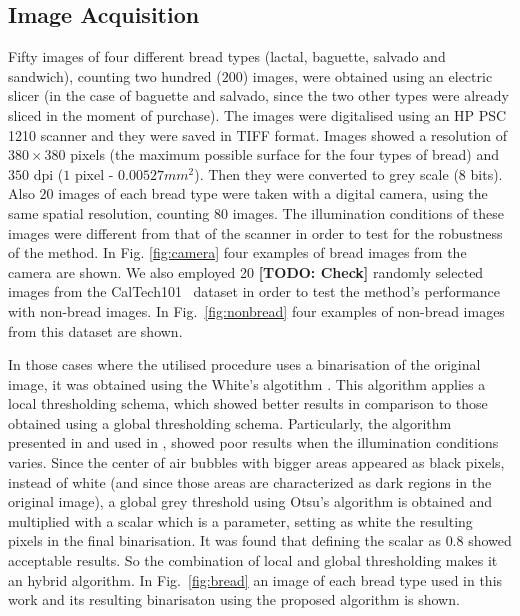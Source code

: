 \documentclass[oneside,a4paper,english,links]{amca}
\newcommand{\todo}[1]{\textbf{[TODO: #1]}}
\begin{document}
\subsection{Image Acquisition}
Fifty images of four different bread types (lactal, baguette, salvado and sandwich), counting two hundred ($200$) images, were obtained using an electric slicer (in the case of baguette and salvado, since the two other types were already sliced in the moment of purchase). The images were digitalised using an HP PSC 1210 scanner and they were saved in TIFF format. Images showed a resolution of $380 \times 380$ pixels (the maximum possible surface for the four types of bread) and $350$ dpi ($1$ pixel - $0.00527 mm^{2}$). Then they were converted to grey scale ($8$ bits). Also $20$ images of each bread type were taken with a digital camera, using the same spatial resolution, counting $80$ images. The illumination conditions of these images were different from that of the scanner in order to test for the robustness of the method. In Fig. \ref{fig:camera} four examples of bread images from the camera are shown. We also employed 20 \todo{Check} randomly selected images from the CalTech101~\cite{FeiFei04} dataset in order to test the method's performance with non-bread images. In Fig.~\ref{fig:nonbread} four examples of non-bread images from this dataset are shown. 

In those cases where the utilised procedure uses a binarisation of the original image, it was obtained using the White's algotithm \cite{White83}. This algorithm applies a local thresholding schema, which showed better results in comparison to those obtained using a global thresholding schema. Particularly, the algorithm presented in \cite{Huang95} and used in \cite{Gonzales2008}, showed poor results when the illumination conditions varies. Since the center of air bubbles with bigger areas appeared as black pixels, instead of white (and since those areas are characterized as dark regions in the original image), a global grey threshold using Otsu's algorithm \cite{Otsu79} is obtained and multiplied with a scalar which is a parameter, setting as white the resulting pixels in the final binarisation. It was found that defining the scalar as $0.8$ showed acceptable results. So the combination of local and global thresholding makes it an hybrid algorithm. In Fig.~\ref{fig:bread} an image of each bread type used in this work and its resulting binarisaton using the proposed algorithm is shown.  
\end{document}
